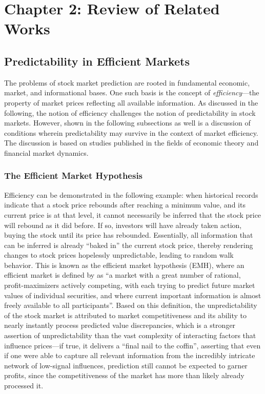 \documentclass[stu,floatsintext]{apa7}
\begin{document}
\clearpage
\section{Chapter 2: Review of Related Works}

\subsection{Predictability in Efficient Markets}

The problems of stock market prediction are rooted in fundamental economic, market, and informational bases. One such basis is the concept of \textit{efficiency}—the property of market prices reflecting all available information. As discussed in the following, the notion of efficiency challenges the notion of predictability in stock markets. However, shown in the following subsections as well is a discussion of conditions wherein predictability may survive in the context of market efficiency. The discussion is based on studies published in the fields of economic theory and financial market dynamics.

\subsubsection{The Efficient Market Hypothesis}

Efficiency can be demonstrated in the following example: when historical records indicate that a stock price rebounds after reaching a minimum value, and its current price is at that level, it cannot necessarily be inferred that the stock price will rebound as it did before. If so, investors will have already taken action, buying the stock until its price has rebounded. Essentially, all information that can be inferred is already “baked in” the current stock price, thereby rendering changes to stock prices hopelessly unpredictable, leading to random walk behavior. This is known as the efficient market hypothesis (EMH), where an efficient market is defined by \textcite{fama1970efficient} as “a market with a great number of rational, profit-maximizers actively competing, with each trying to predict future market values of individual securities, and where current important information is almost freely available to all participants”. Based on this definition, the unpredictability of the stock market is attributed to market competitiveness and its ability to nearly instantly process predicted value discrepancies, which is a stronger assertion of unpredictability than the vast complexity of interacting factors that influence prices—if true, it delivers a “final nail to the coffin”, asserting that even if one were able to capture all relevant information from the incredibly intricate network of low-signal influences, prediction still cannot be expected to garner profits, since the competitiveness of the market has more than likely already processed it.
\end{document}
